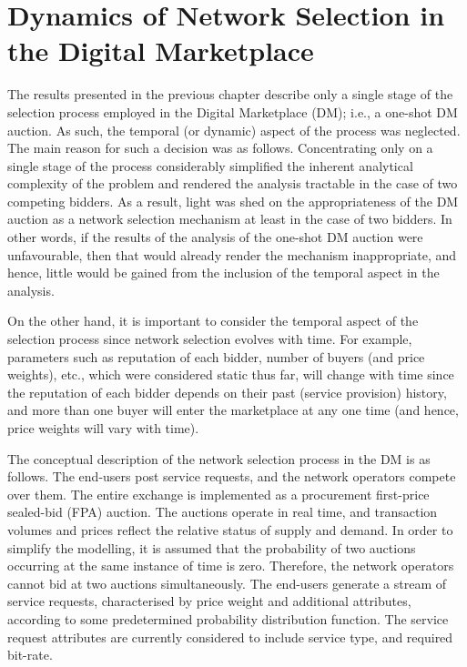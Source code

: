 \chapter{Dynamics of Network Selection in the Digital Marketplace} %
\label{cha:dynamics_of_network_selection_in_the_digital_marketplace}

\minitoc
\vspace{10mm}

The results presented in the previous chapter describe only a single stage of the selection process employed in the Digital Marketplace (DM); i.e., a one-shot DM auction. As such, the temporal (or dynamic) aspect of the process was neglected. The main reason for such a decision was as follows. Concentrating only on a single stage of the process considerably simplified the inherent analytical complexity of the problem and rendered the analysis tractable in the case of two competing bidders. As a result, light was shed on the appropriateness of the DM auction as a network selection mechanism at least in the case of two bidders. In other words, if the results of the analysis of the one-shot DM auction were unfavourable, then that would already render the mechanism inappropriate, and hence, little would be gained from the inclusion of the temporal aspect in the analysis.

On the other hand, it is important to consider the temporal aspect of the selection process since network selection evolves with time. For example, parameters such as reputation of each bidder, number of buyers (and price weights), etc., which were considered static thus far, will change with time since the reputation of each bidder depends on their past (service provision) history, and more than one buyer will enter the marketplace at any one time (and hence, price weights will vary with time).

The conceptual description of the network selection process in the DM is as follows. The end-users post service requests, and the network operators compete over them. The entire exchange is implemented as a procurement first-price sealed-bid (FPA) auction. The auctions operate in real time, and transaction volumes and prices reflect the relative status of supply and demand. In order to simplify the modelling, it is assumed that the probability of two auctions occurring at the same instance of time is zero. Therefore, the network operators cannot bid at two auctions simultaneously. The end-users generate a stream of service requests, characterised by price weight and additional attributes, according to some predetermined probability distribution function. The service request attributes are currently considered to include service type, and required bit-rate.

